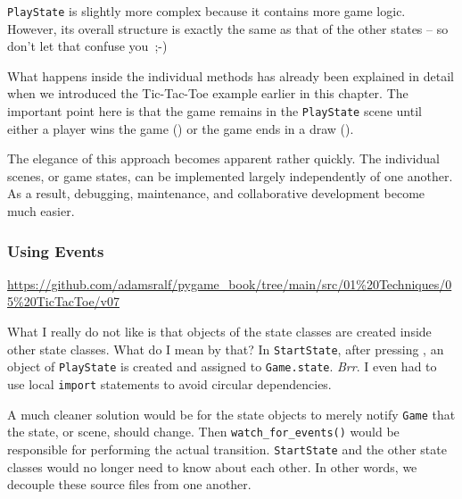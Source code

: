 
\texttt{PlayState} is slightly more complex because it contains more game logic. However, its overall structure is exactly the same as that of the other states -- so don't let that confuse you~{;-)}

What happens inside the individual methods has already been explained in detail when we introduced the Tic-Tac-Toe example earlier in this chapter. The important point here is that the game remains in the \texttt{PlayState} scene until either a player wins the game () or the game ends in a draw ().

\newpage
{}

The elegance of this approach becomes apparent rather quickly. The individual scenes, or game states, can be implemented largely independently of one another. As a result, debugging, maintenance, and collaborative development become much easier.

\subsubsection{Using Events}
\begin{diskbox}
	\url{https://github.com/adamsralf/pygame_book/tree/main/src/01%20Techniques/05%20TicTacToe/v07}
\end{diskbox}

What I really do not like is that objects of the state classes are created inside other state classes. What do I mean by that? In \texttt{StartState}, after pressing , an object of \texttt{PlayState} is created and assigned to \texttt{Game.state}. \emph{Brr}. I even had to use local \texttt{import} statements to avoid circular dependencies.

A much cleaner solution would be for the state objects to merely notify \texttt{Game} that the state, or scene, should change. Then \texttt{watch\_for\_events()} would be responsible for performing the actual transition. \texttt{StartState} and the other state classes would no longer need to know about each other. In other words, we decouple these source files from one another.

